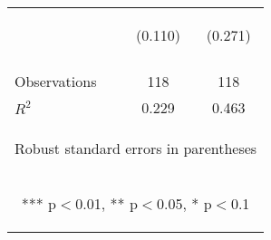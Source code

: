 \begin{center}
\begin{tabular}{lcc}
 & \begin{footnotesize}(0.110)\end{footnotesize} & \begin{footnotesize}(0.271)\end{footnotesize} \\
\vspace{4pt} & \begin{footnotesize}\end{footnotesize} & \begin{footnotesize}\end{footnotesize} \\
Observations & 118 & 118 \\
 $R^2$ & 0.229 & 0.463 \\ \hline
\multicolumn{3}{c}{\begin{footnotesize} Robust standard errors in parentheses\end{footnotesize}} \\
\multicolumn{3}{c}{\begin{footnotesize} *** p$<$0.01, ** p$<$0.05, * p$<$0.1\end{footnotesize}} \\
\end{tabular}
\end{center}
